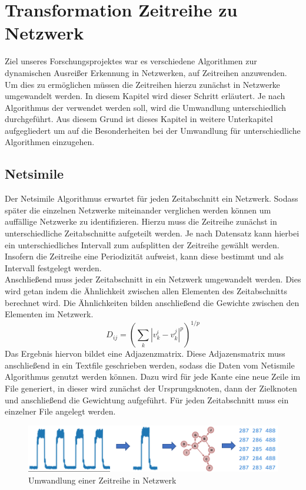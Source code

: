 \newpage
\chapter{Transformation Zeitreihe zu Netzwerk}
Ziel unseres Forschungsprojektes war es verschiedene Algorithmen zur dynamischen Ausreißer Erkennung in Netzwerken, auf Zeitreihen anzuwenden. Um dies zu ermöglichen müssen die Zeitreihen hierzu zunächst in Netzwerke umgewandelt werden. In diesem Kapitel wird dieser Schritt erläutert. Je nach Algorithmus der verwendet werden soll, wird die Umwandlung unterschiedlich durchgeführt. Aus diesem Grund ist dieses Kapitel in weitere Unterkapitel aufgegliedert um auf die Besonderheiten bei der Umwandlung für unterschiedliche Algorithmen einzugehen.
\section{Netsimile}
\label{chap:trsnsNeti}
Der Netsimile Algorithmus erwartet für jeden Zeitabschnitt ein Netzwerk. Sodass später die einzelnen Netzwerke miteinander verglichen werden können um auffällige Netzwerke zu identifizieren. Hierzu muss die Zeitreihe zunächst in unterschiedliche Zeitabschnitte aufgeteilt werden. Je nach Datensatz kann hierbei ein unterschiedliches Intervall zum aufsplitten der Zeitreihe gewählt werden. Insofern die Zeitreihe eine Periodizität aufweist, kann diese bestimmt und als Intervall festgelegt werden.\\ 
Anschließend muss jeder Zeitabschnitt in ein Netzwerk umgewandelt werden. Dies wird getan indem die Ähnlichkeit zwischen allen Elementen des Zeitabschnitts berechnet wird. Die Ähnlichkeiten bilden anschließend die Gewichte zwischen den Elementen im Netzwerk.
$$D_{ij}=\left(\sum_{k} \left|v_{k}^{i}-v_{k}^{j}\right|^{p}\right)^{1/p}$$
Das Ergebnis hiervon bildet eine Adjazenzmatrix. Diese Adjazensmatrix muss anschließend in ein Textfile geschrieben werden, sodass die Daten vom Netismile Algorithmus genutzt werden können. Dazu wird für jede Kante eine neue Zeile im File generiert, in dieser wird zunächst der Ursprungsknoten, dann der Zielknoten und anschließend die Gewichtung aufgeführt. Für jeden Zeitabschnitt muss ein einzelner File angelegt werden. 

\begin{figure}[H]
	\centering
	\includegraphics[width=13cm]{fig/tsToNet/tsToCsv}
	\caption{Umwandlung einer Zeitreihe in Netzwerk}
	\label{img:tsToNet}
\end{figure}




